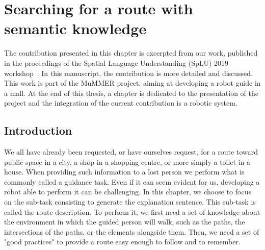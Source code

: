 \ifdefined{}
\else
\setcounter{chapter}{3} %
\dominitoc
\faketableofcontents
\fi

\chapter{Searching for a route with semantic knowledge}
\label{chap:3}
\minitoc

The contribution presented in this chapter is excerpted from our work, published in the proceedings of the Spatial Language Understanding (SpLU) 2019 workshop~\cite{sarthou_2019_semantic}. In this manuscript, the contribution is more detailed and discussed. This work is part of the MuMMER project, aiming at developing a robot guide in a mall. At the end of this thesis, a chapter is dedicated to the presentation of the project and the integration of the current contribution is a robotic system.

\section{Introduction}

We all have already been requested, or have ourselves request, for a route toward public space in a city, a shop in a shopping centre, or more simply a toilet in a house. When providing such information to a lost person we perform what is commonly called a guidance task. Even if it can seem evident for us, developing a robot able to perform it can be challenging. In this chapter, we choose to focus on the sub-task consisting to generate the explanation sentence. This sub-task is called the route description. To perform it, we first need a set of knowledge about the environment in which the guided person will walk, such as the paths, the intersections of the paths, or the elements alongside them. Then, we need a set of "good practices" to provide a route easy enough to follow and to remember.

